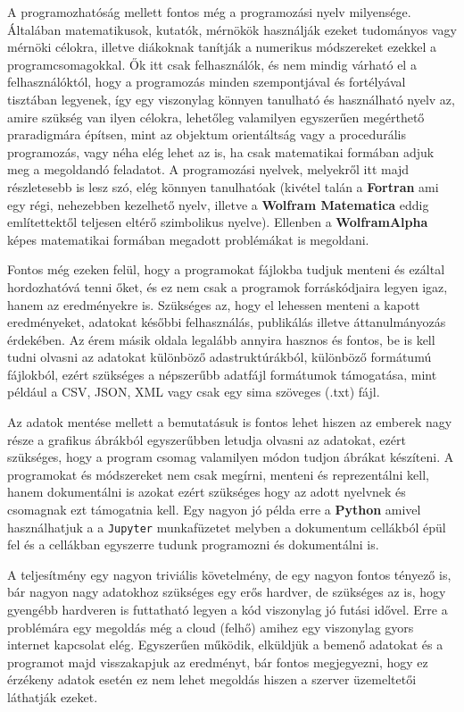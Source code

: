 A programozhatóság mellett fontos még a programozási nyelv milyensége.
Általában matematikusok, kutatók, mérnökök használják ezeket tudományos
vagy mérnöki célokra, illetve diákoknak tanítják a numerikus módszereket
ezekkel a programcsomagokkal. Ők itt csak felhasználók, és nem mindig
várható el a felhasználóktól, hogy a programozás minden szempontjával és
fortélyával tisztában legyenek, így egy viszonylag könnyen tanulható és
használható nyelv az, amire szükség van ilyen célokra, lehetőleg
valamilyen egyszerűen megérthető praradigmára építsen, mint az objektum
orientáltság vagy a procedurális programozás, vagy néha elég lehet az
is, ha csak matematikai formában adjuk meg a megoldandó feladatot. A
programozási nyelvek, melyekről itt majd részletesebb is lesz szó, elég
könnyen tanulhatóak (kivétel talán a \textbf{Fortran} ami egy régi,
nehezebben kezelhető nyelv, illetve a \textbf{Wolfram Matematica} eddig
említettektől teljesen eltérő szimbolikus nyelve). Ellenben a
\textbf{WolframAlpha} képes matematikai formában megadott problémákat is
megoldani.

Fontos még ezeken felül, hogy a programokat fájlokba tudjuk menteni és
ezáltal hordozhatóvá tenni őket, és ez nem csak a programok
forráskódjaira legyen igaz, hanem az eredményekre is. Szükséges az, hogy
el lehessen menteni a kapott eredményeket, adatokat későbbi
felhasználás, publikálás illetve áttanulmányozás érdekében. Az érem
másik oldala legalább annyira hasznos és fontos, be is kell tudni
olvasni az adatokat különböző adastruktúrákból, különböző formátumú
fájlokból, ezért szükséges a népszerűbb adatfájl formátumok támogatása,
mint például a CSV, JSON, XML vagy csak egy sima szöveges (.txt) fájl.

Az adatok mentése mellett a bemutatásuk is fontos lehet hiszen az
emberek nagy része a grafikus ábrákból egyszerűbben letudja olvasni az
adatokat, ezért szükséges, hogy a program csomag valamilyen módon tudjon
ábrákat készíteni. A programokat és módszereket nem csak megírni,
menteni és reprezentálni kell, hanem dokumentálni is azokat ezért
szükséges hogy az adott nyelvnek és csomagnak ezt támogatnia kell. Egy
nagyon jó példa erre a \textbf{Python} amivel használhatjuk a a
\texttt{Jupyter} munkafüzetet melyben a dokumentum cellákból épül fel és
a cellákban egyszerre tudunk programozni és dokumentálni is.

A teljesítmény egy nagyon triviális követelmény, de egy nagyon fontos
tényező is, bár nagyon nagy adatokhoz szükséges egy erős hardver, de
szükséges az is, hogy gyengébb hardveren is futtatható legyen a kód
viszonylag jó futási idővel. Erre a problémára egy megoldás még a cloud
(felhő) amihez egy viszonylag gyors internet kapcsolat elég. Egyszerűen
működik, elküldjük a bemenő adatokat és a programot majd visszakapjuk az
eredményt, bár fontos megjegyezni, hogy ez érzékeny adatok esetén ez nem
lehet megoldás hiszen a szerver üzemeltetői láthatják ezeket.

